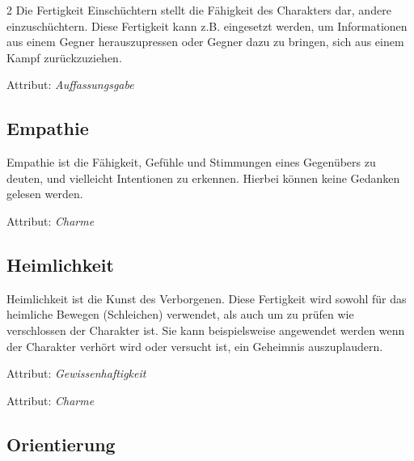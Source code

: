 \begin{multicols}{2}
Die Fertigkeit Einschüchtern stellt die Fähigkeit des Charakters dar, andere einzuschüchtern. Diese Fertigkeit kann z.B. eingesetzt werden, um Informationen aus einem Gegner herauszupressen oder Gegner dazu zu bringen, sich aus einem Kampf zurückzuziehen.

Attribut: \textit{Auffassungsgabe}

\subsection{Empathie}

Empathie ist die Fähigkeit, Gefühle und Stimmungen eines Gegenübers zu deuten, und vielleicht Intentionen zu erkennen. Hierbei können keine Gedanken gelesen werden.

Attribut: \textit{Charme}

\subsection{Heimlichkeit}

Heimlichkeit ist die Kunst des Verborgenen. Diese Fertigkeit wird sowohl für das heimliche Bewegen (Schleichen) verwendet, als auch um zu prüfen wie verschlossen der Charakter ist. Sie kann beispielsweise angewendet werden wenn der Charakter verhört wird oder versucht ist, ein Geheimnis auszuplaudern.

Attribut: \textit{Gewissenhaftigkeit}


Attribut: \textit{Charme}

\subsection{Orientierung}


\end{multicols}
